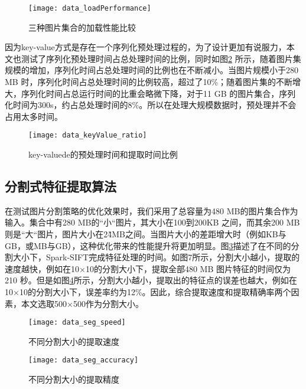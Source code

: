 \begin{figure}[htp]
\centering
\texttt{[image: data\_loadPerformance]}
\caption{三种图片集合的加载性能比较}
\label{fig:data_loadPerformance}
\end{figure}
因为key-value方式是存在一个序列化预处理过程的，为了设计更加有说服力，本文也测试了序列化预处理时间占总处理时间的比例，同时如图\ref{fig:data_keyValue_ratio} 所示，随着图片集规模的增加，序列化时间占总处理时间的比例也在不断减小。当图片规模小于280 MB 时，序列化时间占总处理时间的比例较高，超过了10\%；随着图片集的不断增大，序列化时间占总运行时间的比重会略微下降，对于11 GB 的图片集合，序列化时间为300s，约占总处理时间的8\%。所以在处理大规模数据时，预处理并不会占用太多时间。
\begin{figure}[htp]
\centering
\texttt{[image: data\_keyValue\_ratio]}
\caption{key-valuede的预处理时间和提取时间比例}
\label{fig:data_keyValue_ratio}
\end{figure}

\subsection{分割式特征提取算法}
在测试图片分割策略的优化效果时，我们采用了总容量为480 MB的图片集合作为输入。集合中有280 MB的``小``图片，其大小在100到200KB 之间，而其余200 MB则是``大``图片，图片大小在2\~4MB之间。当图片大小的差距增大时（例如KB与GB，或MB与GB），这种优化带来的性能提升将更加明显。图\ref{fig:data_seg_speed}描述了在不同的分割大小下，Spark-SIFT完成特征处理的时间。如图7所示，分割大小越小，提取的速度越快，例如在10×10的分割大小下，提取全部480 MB 图片特征的时间仅为210 秒。但是如图\ref{fig:data_seg_accuracy}所示，分割大小越小，提取出的特征点的误差也越大，例如在10×10的分割大小下，误差率约为12\%。因此，综合提取速度和提取精确率两个因素，本文选取500×500作为分割大小。
\begin{figure}[htp]
\centering
\texttt{[image: data\_seg\_speed]}
\caption{不同分割大小的提取速度}
\label{fig:data_seg_speed}
\end{figure}

\begin{figure}[htp]
\centering
\texttt{[image: data\_seg\_accuracy]}
\caption{不同分割大小的提取精度}
\label{fig:data_seg_accuracy}
\end{figure}

